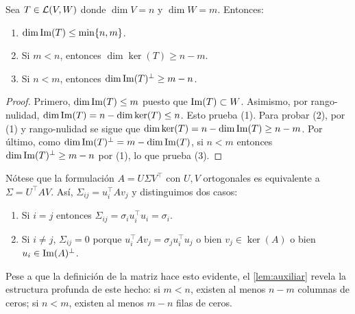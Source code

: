\begin{lemma}\label{lem:auxiliar}
	Sea $T\in \mathcal{L}(V,W)$ donde $\dim V=n$ y $\dim W=m$. Entonces:
	\begin{enumerate}
		\item $\dim \operatorname{Im} (T)\leq\min\{n,m\}$.
		\item Si $m<n$, entonces $\dim \ker(T)\geq n-m$.
		\item Si $n<m$, entonces $\dim \operatorname{Im}(T)^{\perp}\geq m-n$.
	\end{enumerate}
\end{lemma}

\begin{proof}
	Primero, $\dim \operatorname{Im}(T)\leq m$ puesto que $\operatorname{Im}(T)\subset W$. Asimismo, por rango-nulidad, $\dim \operatorname{Im}(T)=n-\dim\ker(T)\leq n$. Esto prueba (1). Para probar (2), por (1) y rango-nulidad se sigue que $\dim \ker(T)=n-\dim \operatorname{Im}(T)\geq n-m$. Por último, como $\dim \operatorname{Im}(T)^{\perp}=m-\dim \operatorname{Im}(T)$, si $n<m$ entonces $\dim \operatorname{Im}(T)^{\perp}\geq m-n$ por (1), lo que prueba (3).
\end{proof}

\begin{informal}
	Nótese que la formulación $A=U\Sigma V^{\top}$ con $U,V$ ortogonales es equivalente a $\Sigma=U^{\top}AV$. Así, $\Sigma_{ij}=u_i^{\top}Av_j$ y distinguimos dos casos:
	\begin{enumerate}
		\item Si $i=j$ entonces $\Sigma_{ij}=\sigma_i u_i^{\top}u_i=\sigma_i$.
		\item Si $i\neq j$, $\Sigma_{ij}=0$ porque $u_i^{\top}Av_j=\sigma_j u_i^\top  u_j$ o bien $v_j \in \ker(A)$ o bien $u_i \in \operatorname{Im}(A)^{\perp}$.
	\end{enumerate}
	Pese a que la definición de la matriz hace esto evidente, el \cref{lem:auxiliar} revela la estructura profunda de este hecho: si $m<n$, existen al menos $n-m$ columnas de ceros; si $n<m$, existen al menos $m-n$ filas de ceros.
\end{informal}

